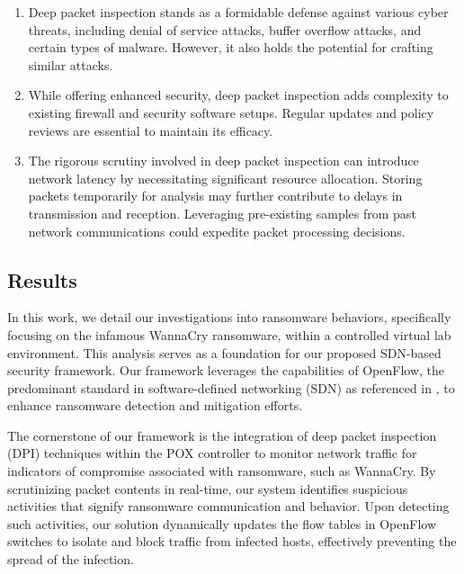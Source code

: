 \documentclass[12pt,letterpaper]{article}
\begin{document}
            \begin{enumerate}
                \item Deep packet inspection stands as a formidable defense against various cyber threats, including denial of service attacks, buffer overflow attacks, and certain types of malware. However, it also holds the potential for crafting similar attacks.

                \item While offering enhanced security, deep packet inspection adds complexity to existing firewall and security software setups. Regular updates and policy reviews are essential to maintain its efficacy.

                \item The rigorous scrutiny involved in deep packet inspection can introduce network latency by necessitating significant resource allocation. Storing packets temporarily for analysis may further contribute to delays in transmission and reception. Leveraging pre-existing samples from past network communications could expedite packet processing decisions.
                
            \end{enumerate}

    \subsection{Results}

    In this work, we detail our investigations into ransomware behaviors, specifically focusing on the infamous WannaCry ransomware, within a controlled virtual lab environment. This analysis serves as a foundation for our proposed SDN-based security framework. Our framework leverages the capabilities of OpenFlow, the predominant standard in software-defined networking (SDN) as referenced in \cite{10.1145/1355734.1355746, KazuyaSUZUKI2014}, to enhance ransomware detection and mitigation efforts.

    The cornerstone of our framework is the integration of deep packet inspection (DPI) techniques within the POX controller to monitor network traffic for indicators of compromise associated with ransomware, such as WannaCry. By scrutinizing packet contents in real-time, our system identifies suspicious activities that signify ransomware communication and behavior. Upon detecting such activities, our solution dynamically updates the flow tables in OpenFlow switches to isolate and block traffic from infected hosts, effectively preventing the spread of the infection.
\end{document}
